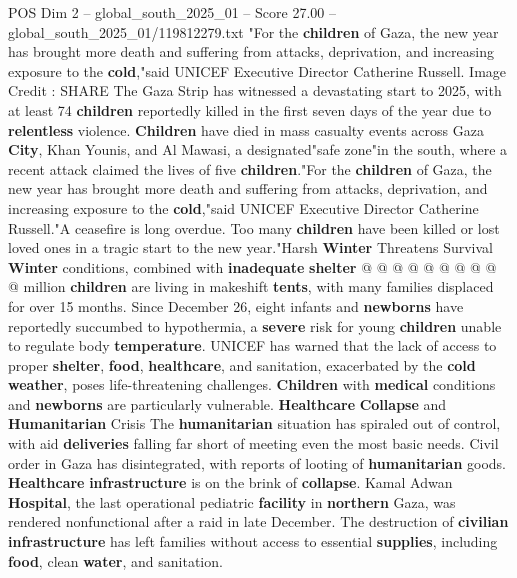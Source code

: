 \begin{textsample}{POS Dim 2 – global\_south\_2025\_01 – Score 27.00 – global\_south\_2025\_01/119812279.txt}  \label{ex:f2_pos_315}
"For the \textbf{children} of Gaza, the new year has brought more death and suffering from attacks, deprivation, and increasing exposure to the \textbf{cold},"said UNICEF Executive Director Catherine Russell.
Image Credit : SHARE The Gaza Strip has witnessed a devastating start to 2025, with at least 74 \textbf{children} reportedly killed in the first seven days of the year due to \textbf{relentless} violence. \textbf{Children} have died in mass casualty events across Gaza \textbf{City}, Khan Younis, and Al Mawasi, a designated"safe zone"in the south, where a recent attack claimed the lives of five \textbf{children}."For the \textbf{children} of Gaza, the new year has brought more death and suffering from attacks, deprivation, and increasing exposure to the \textbf{cold},"said UNICEF Executive Director Catherine Russell."A ceasefire is long overdue.
Too many \textbf{children} have been killed or lost loved ones in a tragic start to the new year."Harsh \textbf{Winter} Threatens Survival \textbf{Winter} conditions, combined with \textbf{inadequate} \textbf{shelter} @ @ @ @ @ @ @ @ @ @ million \textbf{children} are living in makeshift \textbf{tents}, with many families displaced for over 15 months.
Since December 26, eight infants and \textbf{newborns} have reportedly succumbed to hypothermia, a \textbf{severe} risk for young \textbf{children} unable to regulate body \textbf{temperature}.
UNICEF has warned that the lack of access to proper \textbf{shelter}, \textbf{food}, \textbf{healthcare}, and sanitation, exacerbated by the \textbf{cold} \textbf{weather}, poses life-threatening challenges. \textbf{Children} with \textbf{medical} conditions and \textbf{newborns} are particularly vulnerable. \textbf{Healthcare} \textbf{Collapse} and \textbf{Humanitarian} Crisis The \textbf{humanitarian} situation has spiraled out of control, with aid \textbf{deliveries} falling far short of meeting even the most basic needs.
Civil order in Gaza has disintegrated, with reports of looting of \textbf{humanitarian} goods. \textbf{Healthcare} \textbf{infrastructure} is on the brink of \textbf{collapse}.
Kamal Adwan \textbf{Hospital}, the last operational pediatric \textbf{facility} in \textbf{northern} Gaza, was rendered nonfunctional after a raid in late December.
The destruction of \textbf{civilian} \textbf{infrastructure} has left families without access to essential \textbf{supplies}, including \textbf{food}, clean \textbf{water}, and sanitation.

\end{textsample}
